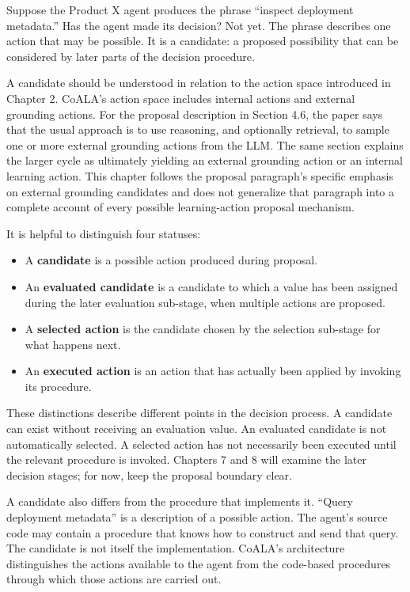 Suppose the Product X agent produces the phrase ``inspect deployment metadata.'' Has the agent made its decision? Not yet. The phrase describes one action that may be possible. It is a candidate: a proposed possibility that can be considered by later parts of the decision procedure.

A candidate should be understood in relation to the action space introduced in Chapter 2. CoALA's action space includes internal actions and external grounding actions. For the proposal description in Section 4.6, the paper says that the usual approach is to use reasoning, and optionally retrieval, to sample one or more external grounding actions from the LLM. The same section explains the larger cycle as ultimately yielding an external grounding action or an internal learning action. This chapter follows the proposal paragraph's specific emphasis on external grounding candidates and does not generalize that paragraph into a complete account of every possible learning-action proposal mechanism.

It is helpful to distinguish four statuses:

\begin{itemize}
  \item A \textbf{candidate} is a possible action produced during proposal.
  \item An \textbf{evaluated candidate} is a candidate to which a value has been assigned during the later evaluation sub-stage, when multiple actions are proposed.
  \item A \textbf{selected action} is the candidate chosen by the selection sub-stage for what happens next.
  \item An \textbf{executed action} is an action that has actually been applied by invoking its procedure.
\end{itemize}

These distinctions describe different points in the decision process. A candidate can exist without receiving an evaluation value. An evaluated candidate is not automatically selected. A selected action has not necessarily been executed until the relevant procedure is invoked. Chapters 7 and 8 will examine the later decision stages; for now, keep the proposal boundary clear.

A candidate also differs from the procedure that implements it. ``Query deployment metadata'' is a description of a possible action. The agent's source code may contain a procedure that knows how to construct and send that query. The candidate is not itself the implementation. CoALA's architecture distinguishes the actions available to the agent from the code-based procedures through which those actions are carried out.

